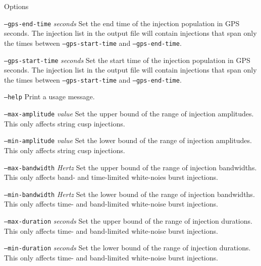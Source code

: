 \documentclass[10pt]{article}
\newcommand{\option}[1]{\texttt{#1}}
\newcommand{\parm}[1]{\textit{#1}}
\newenvironment{entry}%
{\begin{list}{}{\renewcommand{\makelabel}[1]%
{\parbox[b]{\labelwidth}{\makebox[0pt][l]{\textbf{##1}}\\}}%
\setlength{\labelwidth}{1em}%
\setlength{\labelsep}{1em}%
\setlength{\leftmargin}{2em}%
\setlength{\topsep}{\medskipamount}%
\setlength{\itemsep}{\medskipamount}%
\setlength{\parsep}{\medskipamount}%
\setlength{\listparindent}{0pt}}}
{\end{list}}
\begin{document}
\begin{entry}
\item[Options]\leavevmode
\begin{entry}
\item[\option{--gps-end-time} \parm{seconds}]
Set the end time of the injection population in GPS seconds.  The injection
list in the output file will contain injections that span only the times
between \option{--gps-start-time} and \option{--gps-end-time}.

\item[\option{--gps-start-time} \parm{seconds}]
Set the start time of the injection population in GPS seconds.  The
injection list in the output file will contain injections that span only
the times between \option{--gps-start-time} and \option{--gps-end-time}.

\item[\option{--help}]
Print a usage message.

\item[\option{--max-amplitude} \parm{value}]
Set the upper bound of the range of injection amplitudes.  This only
affects string cusp injections.

\item[\option{--min-amplitude} \parm{value}]
Set the lower bound of the range of injection amplitudes.  This only
affects string cusp injections.

\item[\option{--max-bandwidth} \parm{Hertz}]
Set the upper bound of the range of injection bandwidths.  This only
affects band- and time-limited white-noies burst injections.

\item[\option{--min-bandwidth} \parm{Hertz}]
Set the lower bound of the range of injection bandwidths.  This only
affects time- and band-limited white-noise burst injections.

\item[\option{--max-duration} \parm{seconds}]
Set the upper bound of the range of injection durations.  This only affects
time- and band-limited white-noise burst injections.

\item[\option{--min-duration} \parm{seconds}]
Set the lower bound of the range of injection durations.  This only affects
time- and band-limited white-noise burst injections.


\end{entry}
\end{entry}
\end{document}
